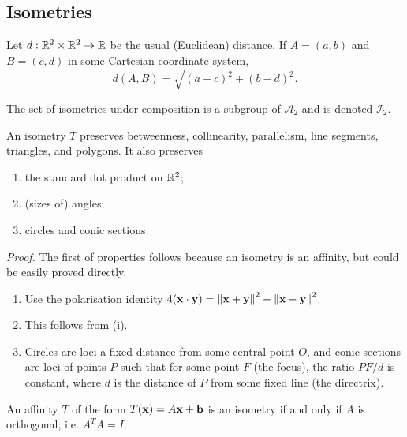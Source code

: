 \subsection{Isometries}

Let \(d: \mathbb{R}^2 \times \mathbb{R}^2 \to \mathbb{R}\) be the usual (Euclidean) distance. If \(A = (a, b)\) and \(B = (c, d)\) in some Cartesian coordinate system,
\[d(A, B) = \sqrt{(a - c)^2 + (b - d)^2}.\]



\begin{theorem}
    The set of isometries under composition is a subgroup of \(\mathcal{A}_2\) and is denoted \(\mathcal{I}_2\).
\end{theorem}

\begin{theorem}
    An isometry \(T\) preserves betweenness, collinearity, parallelism, line segments, triangles, and polygons. It also preserves
    \begin{enumerate}[label=\roman*)]
        \item the standard dot product on \(\mathbb{R}^2\);
        \item (sizes of) angles;
        \item circles and conic sections.
    \end{enumerate}
\end{theorem}

\textit{Proof.} The first of properties follows because an isometry is an affinity, but could be easily proved directly.
\begin{enumerate}[label=\roman*)]
    \item Use the polarisation identity \(4(\mathbf{x} \cdot \mathbf{y}) = \norm{\mathbf{x} + \mathbf{y}}^2 - \norm{\mathbf{x} - \mathbf{y}}^2\).
    \item This follows from (i).
    \item Circles  are loci a fixed distance from some central point \(O\), and conic sections are loci of points \(P\) such that for some point \(F\) (the focus), the ratio \(PF / d\) is constant, where \(d\) is the distance of \(P\) from some fixed line (the directrix).
\end{enumerate}

\begin{theorem}
    An affinity \(T\) of the form \(T(\mathbf{x}) = A\mathbf{x} + \mathbf{b}\) is an isometry if and only if \(A\) is orthogonal, i.e. \(A^TA = I\).
\end{theorem}

